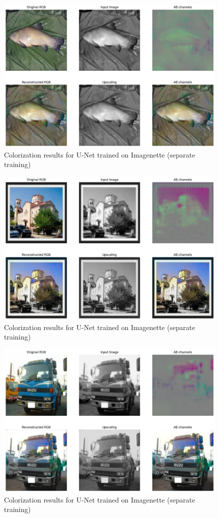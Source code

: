 \documentclass[aspectratio=169]{beamer}
\theoremstyle{definition}
\begin{document}
\begin{frame}
    \begin{figure}
        \centering
        \includegraphics[width=.75\textwidth]{demo-pipeline/fish.png}
        \caption{Colorization results for U-Net trained on Imagenette (separate training)}
    \end{figure}
\end{frame}

\begin{frame}
    \begin{figure}
        \centering
        \includegraphics[width=.75\textwidth]{demo-pipeline/building2.png}
        \caption{Colorization results for U-Net trained on Imagenette (separate training)}
    \end{figure}
\end{frame}

\begin{frame}
    \begin{figure}
        \centering
        \includegraphics[width=.75\textwidth]{demo-pipeline/truc.png}
        \caption{Colorization results for U-Net trained on Imagenette (separate training)}
    \end{figure}
\end{frame}
\end{document}
